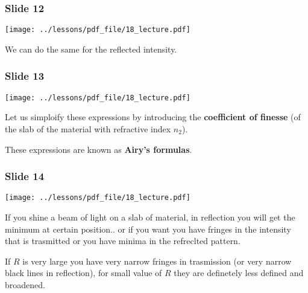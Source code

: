\documentclass[../main/main.tex]{subfiles}
\begin{document}
\subsubsection*{Slide 12}

\begin{minipage}[]{0.5\linewidth}
\centering
\texttt{[image: ../lessons/pdf\_file/18\_lecture.pdf]}
\end{minipage}
\hspace{0.3cm}\vspace{0.3cm}
\begin{minipage}[c]{0.47\linewidth}

We can do the same for the reflected intensity.

\end{minipage}

\subsubsection*{Slide 13}

\begin{minipage}[]{0.5\linewidth}
\centering
\texttt{[image: ../lessons/pdf\_file/18\_lecture.pdf]}
\end{minipage}
\hspace{0.3cm}\vspace{0.3cm}
\begin{minipage}[c]{0.47\linewidth}

Let us simploify these expressions by introducing the \textbf{coefficient of finesse} (of the slab of the material with refractive index \( n_2 \)).

These expressions are known as \textbf{Airy's formulas}.

\end{minipage}

\subsubsection*{Slide 14}

\begin{minipage}[]{0.5\linewidth}
\centering
\texttt{[image: ../lessons/pdf\_file/18\_lecture.pdf]}
\end{minipage}
\hspace{0.3cm}\vspace{0.3cm}
\begin{minipage}[c]{0.47\linewidth}

If you shine a beam of light on a slab of material, in reflection you will get the minimum at certain position.. or if you want you have fringes in the intensity that is trasmitted or you have minima in the refreclted pattern.

If \( R \) is very large you have very narrow fringes in trasmission (or very narrow black lines in reflection), for small value of \( R \) they are definetely less defined and broadened.

\end{minipage}
\end{document}
